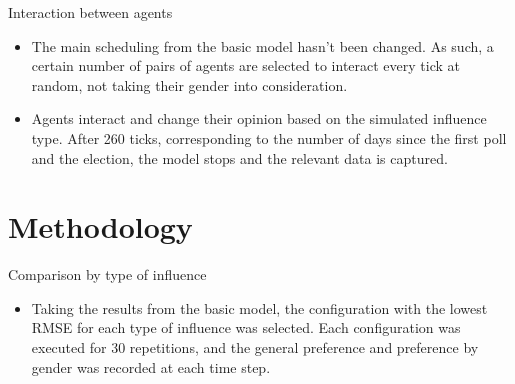 \documentclass{beamer}
\begin{document}
\begin{frame}{Interaction between agents}
	\begin{itemize}
		\item The main scheduling from the basic model hasn't been changed. As such, a certain number of pairs of agents are selected to interact every tick at random, not taking their gender into consideration.
		\item Agents interact and change their opinion based on the simulated influence type. After 260 ticks, corresponding to the number of days since the first poll and the election, the model stops and the relevant data is captured.
	\end{itemize}
\end{frame}

\section{Methodology}
\begin{frame}{Comparison by type of influence}
	\begin{itemize}
		\item Taking the results from the basic model, the configuration with the lowest RMSE for each type of influence was selected. Each configuration was executed for 30 repetitions, and the general preference and preference by gender was recorded at each time step.
		
		\centering
		\begin{table}
		\caption{Configuration with the lowest RMSE by type of influence. Results from previous experiments.}
		\end{table}
	\end{itemize}
\end{frame}
\end{document}
